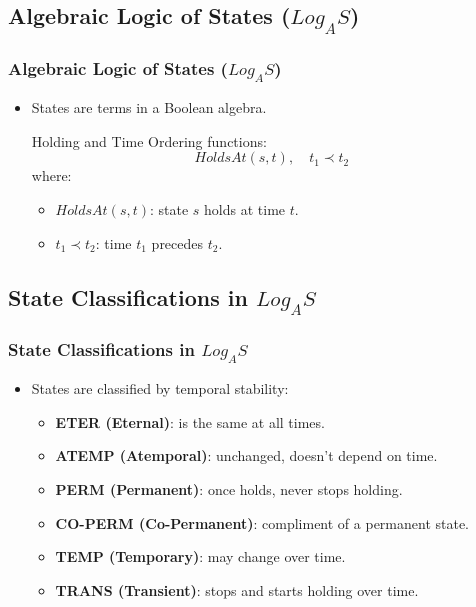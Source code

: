 \documentclass[aspectratio=169]{beamer}
\begin{document}
\subsection{Algebraic Logic of States ($Log_AS$)}
\begin{frame}
\frametitle{Algebraic Logic of States ($Log_AS$)}
\Large 
\begin{itemize}
    \item States are terms in a Boolean algebra.
    \begin{block}{Holding and Time Ordering functions:}
    \[
    HoldsAt(s, t), \quad t_1 \prec t_2
    \]
    \normalsize where:
    \begin{itemize}
        \item $HoldsAt(s, t)$: state $s$ holds at time $t$.
        \item $t_1 \prec t_2$: time $t_1$ precedes $t_2$.
    \end{itemize}
    \end{block}
\end{itemize}
\end{frame}

\subsection{State Classifications in $Log_AS$}
\begin{frame}
\frametitle{State Classifications in $Log_AS$}
\Large
\begin{itemize}
    \item States are classified by temporal stability:
    \begin{itemize}
        \Large 
        \item \textbf{ETER (Eternal)}: is the same at all times.
        \item \textbf{ATEMP (Atemporal)}: unchanged, doesn't depend on time.
        \item \textbf{PERM (Permanent)}: once holds, never stops holding.
        \item \textbf{CO-PERM (Co-Permanent)}: compliment of a permanent state.
        \item \textbf{TEMP (Temporary)}: may change over time.
        \item \textbf{TRANS (Transient)}: stops and starts holding over time.
    \end{itemize}
\end{itemize}
\end{frame}

\end{document}
